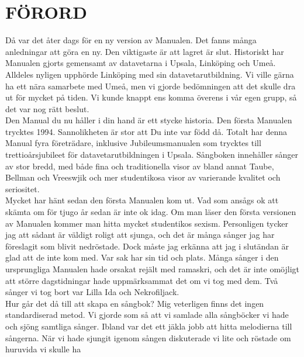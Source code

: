 \documentclass[a6paper,fontsize=10pt,twoside,open=right]{scrbook}
\begin{document}
\section{FÖRORD}\vspace{10pt}
\hspace{10pt}Då var det åter dags för en ny version av Manualen. Det
fanns många anledningar att göra en ny. Den viktigaste är att lagret
är slut. Historiskt har Manualen gjorts gemensamt av datavetarna i
Upsala, Linköping och Umeå. Alldeles nyligen upphörde Linköping med
sin datavetarutbildning. Vi ville gärna ha ett nära samarbete med
Umeå, men vi gjorde bedömningen att det skulle dra ut för mycket på
tiden. Vi kunde knappt ens komma överens i vår egen grupp, så det var
nog rätt beslut.\\
\hspace*{10pt}Den Manual du nu håller i din hand är ett stycke
historia. Den första Manualen trycktes 1994. Sannolikheten är stor att
Du inte var född då. Totalt har denna Manual fyra företrädare,
inklusive Jubileumsmanualen som trycktes till trettioårsjubileet för
datavetarutbildningen i Upsala. Sångboken innehåller sånger av stor
bredd, med både fina och traditionella visor av bland annat Taube,
Bellman och Vreeswjik och mer studentikosa visor av varierande
kvalitet och seriositet.\\
\hspace*{10pt}Mycket har hänt sedan den första Manualen kom ut. Vad som
ansågs ok att skämta om för tjugo år sedan är inte ok idag. Om man
läser den första versionen av Manualen kommer man hitta mycket
studentikos sexism. Personligen tycker jag att sådant är väldigt
roligt att sjunga, och det är många sånger jag har föreslagit som
blivit nedröstade. Dock måste jag erkänna att jag i slutändan är glad
att de inte kom med. Var sak har sin tid och plats. Många sånger i den
ursprungliga Manualen hade orsakat rejält med ramaskri, och det är
inte omöjligt att större dagstidningar hade uppmärksammat det om vi
tog med dem. Två sånger vi tog bort var Lilla Ida och
Nekrofiljack.\\
\hspace*{10pt}Hur går det då till att skapa en sångbok? Mig veterligen
finns det ingen standardiserad metod. Vi gjorde som så att vi samlade
alla sångböcker vi hade och sjöng samtliga sånger. Ibland var det ett
jäkla jobb att hitta melodierna till sångerna. När vi hade sjungit
igenom sången diskuterade vi lite och röstade om huruvida vi skulle ha
\end{document}
